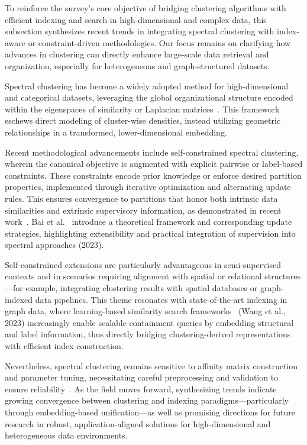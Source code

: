 \documentclass[sigconf]{acmart}
\begin{document}
To reinforce the survey’s core objective of bridging clustering algorithms with efficient indexing and search in high-dimensional and complex data, this subsection synthesizes recent trends in integrating spectral clustering with index-aware or constraint-driven methodologies. Our focus remains on clarifying how advances in clustering can directly enhance large-scale data retrieval and organization, especially for heterogeneous and graph-structured datasets.

Spectral clustering has become a widely adopted method for high-dimensional and categorical datasets, leveraging the global organizational structure encoded within the eigenspaces of similarity or Laplacian matrices~\cite{ref36,ref117}. This framework eschews direct modeling of cluster-wise densities, instead utilizing geometric relationships in a transformed, lower-dimensional embedding.

Recent methodological advancements include self-constrained spectral clustering, wherein the canonical objective is augmented with explicit pairwise or label-based constraints. These constraints encode prior knowledge or enforce desired partition properties, implemented through iterative optimization and alternating update rules. This ensures convergence to partitions that honor both intrinsic data similarities and extrinsic supervisory information, as demonstrated in recent work~\cite{ref117}. Bai et al.~\cite{ref117} introduce a theoretical framework and corresponding update strategies, highlighting extensibility and practical integration of supervision into spectral approaches (2023).

Self-constrained extensions are particularly advantageous in semi-supervised contexts and in scenarios requiring alignment with spatial or relational structures—for example, integrating clustering results with spatial databases or graph-indexed data pipelines. This theme resonates with state-of-the-art indexing in graph data, where learning-based similarity search frameworks~\cite{ref36} (Wang et al., 2023) increasingly enable scalable containment queries by embedding structural and label information, thus directly bridging clustering-derived representations with efficient index construction.

Nevertheless, spectral clustering remains sensitive to affinity matrix construction and parameter tuning, necessitating careful preprocessing and validation to ensure reliability~\cite{ref36,ref117}. As the field moves forward, synthesizing trends indicate growing convergence between clustering and indexing paradigms—particularly through embedding-based unification—as well as promising directions for future research in robust, application-aligned solutions for high-dimensional and heterogeneous data environments.
\end{document}
